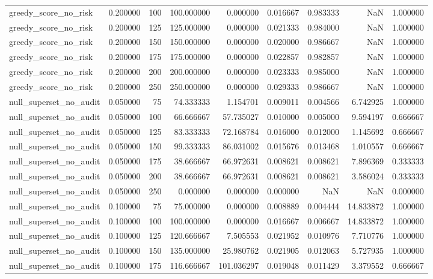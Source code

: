 \begin{tabular}{lrrrrrrrr}
greedy_score_no_risk & 0.200000 & 100 & 100.000000 & 0.000000 & 0.016667 & 0.983333 & NaN & 1.000000 \\
greedy_score_no_risk & 0.200000 & 125 & 125.000000 & 0.000000 & 0.021333 & 0.984000 & NaN & 1.000000 \\
greedy_score_no_risk & 0.200000 & 150 & 150.000000 & 0.000000 & 0.020000 & 0.986667 & NaN & 1.000000 \\
greedy_score_no_risk & 0.200000 & 175 & 175.000000 & 0.000000 & 0.022857 & 0.982857 & NaN & 1.000000 \\
greedy_score_no_risk & 0.200000 & 200 & 200.000000 & 0.000000 & 0.023333 & 0.985000 & NaN & 1.000000 \\
greedy_score_no_risk & 0.200000 & 250 & 250.000000 & 0.000000 & 0.029333 & 0.986667 & NaN & 1.000000 \\
null_superset_no_audit & 0.050000 & 75 & 74.333333 & 1.154701 & 0.009011 & 0.004566 & 6.742925 & 1.000000 \\
null_superset_no_audit & 0.050000 & 100 & 66.666667 & 57.735027 & 0.010000 & 0.005000 & 9.594197 & 0.666667 \\
null_superset_no_audit & 0.050000 & 125 & 83.333333 & 72.168784 & 0.016000 & 0.012000 & 1.145692 & 0.666667 \\
null_superset_no_audit & 0.050000 & 150 & 99.333333 & 86.031002 & 0.015676 & 0.013468 & 1.010557 & 0.666667 \\
null_superset_no_audit & 0.050000 & 175 & 38.666667 & 66.972631 & 0.008621 & 0.008621 & 7.896369 & 0.333333 \\
null_superset_no_audit & 0.050000 & 200 & 38.666667 & 66.972631 & 0.008621 & 0.008621 & 3.586024 & 0.333333 \\
null_superset_no_audit & 0.050000 & 250 & 0.000000 & 0.000000 & 0.000000 & NaN & NaN & 0.000000 \\
null_superset_no_audit & 0.100000 & 75 & 75.000000 & 0.000000 & 0.008889 & 0.004444 & 14.833872 & 1.000000 \\
null_superset_no_audit & 0.100000 & 100 & 100.000000 & 0.000000 & 0.016667 & 0.006667 & 14.833872 & 1.000000 \\
null_superset_no_audit & 0.100000 & 125 & 120.666667 & 7.505553 & 0.021952 & 0.010976 & 7.710776 & 1.000000 \\
null_superset_no_audit & 0.100000 & 150 & 135.000000 & 25.980762 & 0.021905 & 0.012063 & 5.727935 & 1.000000 \\
null_superset_no_audit & 0.100000 & 175 & 116.666667 & 101.036297 & 0.019048 & 0.011429 & 3.379552 & 0.666667 \\

\end{tabular}
